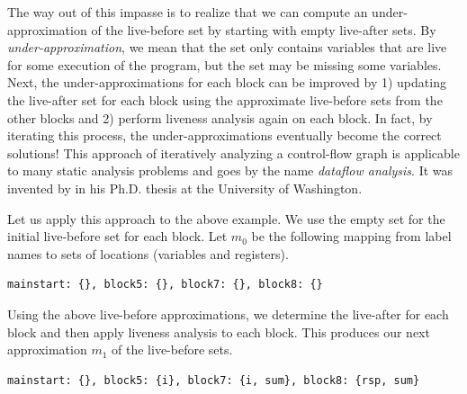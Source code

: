 \documentclass[7x10]{TimesAPriori_MIT}%
\begin{document}
The way out of this impasse is to realize that we can compute an
under-approximation of the live-before set by starting with empty
live-after sets.  By \emph{under-approximation}, we mean that the set
only contains variables that are live for some execution of the
program, but the set may be missing some variables.  Next, the
under-approximations for each block can be improved by 1) updating the
live-after set for each block using the approximate live-before sets
from the other blocks and 2) perform liveness analysis again on each
block.  In fact, by iterating this process, the under-approximations
eventually become the correct solutions!
%
This approach of iteratively analyzing a control-flow graph is
applicable to many static analysis problems and goes by the name
\emph{dataflow analysis}.  It was invented by
\citet{Kildall:1973vn} in his Ph.D. thesis at the University of
Washington.

Let us apply this approach to the above example. We use the empty set
for the initial live-before set for each block. Let $m_0$ be the
following mapping from label names to sets of locations (variables and
registers).
\begin{center}
\begin{lstlisting}
mainstart: {}, block5: {}, block7: {}, block8: {}
\end{lstlisting}
\end{center}
Using the above live-before approximations, we determine the
live-after for each block and then apply liveness analysis to each
block.  This produces our next approximation $m_1$ of the live-before
sets.
\begin{center}
  \begin{lstlisting}
mainstart: {}, block5: {i}, block7: {i, sum}, block8: {rsp, sum}
\end{lstlisting}
\end{center}
\end{document}
